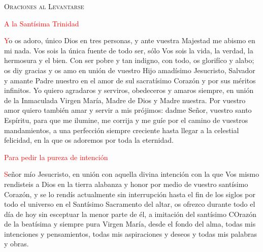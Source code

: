 \documentclass[9pt]{article}
\begin{document}
\begin{center}
      \textsc{\Large{Oraciones al Levantarse}}
\end{center}

\begin{multicols}{2}
      

      \vspace{1mm}

      \begin{otherlanguage}{latin}
            
            
            

            

            

            
      \end{otherlanguage}

      \vspace{1mm}

      \textcolor{red}{A la Santísima Trinidad}

      \textcolor{red}{Y}o os adoro, único Dios en tres personas, y ante vuestra Majestad me abismo en mi nada. Vos sois la única fuente de todo ser, sólo Vos sois la vida, la verdad, la hermosura
      y el bien. Con ser pobre y tan indigno, con todo, os glorifíco y alabo; os diy gracias y os amo en unión de vuestro Hijo amadísimo Jesucristo, Salvador y amante Padre nuestro en el amor de sul
      sacratísimo Corazón y por sus méritos infinitos. Yo quiero agradaros y serviros, obedeceros y amaros siempre, en unión de la Inmaculada Virgen María, Madre de Dios y Madre nuestra.
      Por vuestro amor quiero también amar y servir a mis prójimos: dadme Señor, vuestro santo Espíritu, para que me ilumine, me corrija y me guíe por el camino de vuestros mandamientos, a una
      perfección siempre creciente hasta llegar a la celestial felicidad, en la que os adoremos por toda la eternidad.
      
      \vspace{1mm}

      \textcolor{red}{Para pedir la pureza de intención}

      \textcolor{red}{S}eñor mío Jesucristo, en unión con aquella divina intención con la que Vos mismo rendisteis a Dios en la tierra alabanza y honor por medio de vuestro santísimo Corazón, y se lo rendís
      actualmente sin interrupción hasta el fin de los siglos por todo el universo en el Santísimo Sacramento del altar, os ofrezco durante todo el día de hoy sin esceptuar la menor parte de él,
      a imitación del santísimo COrazón de la beatísima y siempre pura Virgen María, desde el fondo del alma, todas mis intenciones y pensamientos, todas mis aspiraciones y deseos y todas mis
      palabras y obras.


\end{multicols}
\end{document}
